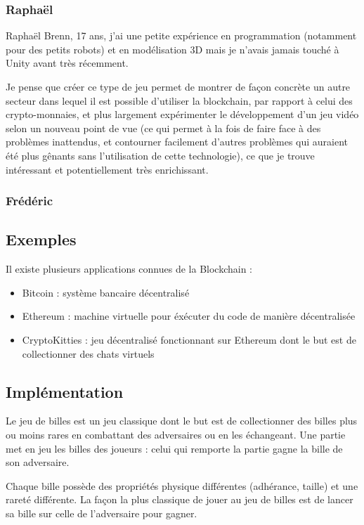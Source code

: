 \documentclass{article}
\begin{document}
\subsubsection{Raphaël}

Raphaël Brenn, 17 ans, j'ai une petite expérience en programmation (notamment pour des petits robots) et en modélisation 3D mais je n'avais jamais touché à Unity avant très récemment.

Je pense que créer ce type de jeu permet de montrer de façon concrète un autre secteur dans lequel il est possible d'utiliser la blockchain, par rapport à celui des crypto-monnaies, et plus largement expérimenter le développement d'un jeu vidéo selon un nouveau point de vue (ce qui permet à la fois de faire face à des problèmes inattendus, et contourner facilement d'autres problèmes qui auraient été plus gênants sans l'utilisation de cette technologie), ce que je trouve intéressant et 
potentiellement très enrichissant.

\subsubsection{Frédéric}

\subsection{Exemples}

Il existe plusieurs applications connues de la Blockchain :
\begin{itemize}
    \item Bitcoin : système bancaire décentralisé
    \item Ethereum : machine virtuelle pour éxécuter du code de manière décentralisée
    \item CryptoKitties : jeu décentralisé fonctionnant sur Ethereum dont le but est de collectionner des chats virtuels
\end{itemize}

\subsection{Implémentation}

Le jeu de billes est un jeu classique dont le but est de collectionner des billes plus ou moins rares en combattant des adversaires ou en les échangeant. Une partie met en jeu les billes des joueurs : celui qui remporte la partie gagne la bille de son adversaire.

Chaque bille possède des propriétés physique différentes (adhérance, taille) et une rareté différente.
La façon la plus classique de jouer au jeu de billes est de lancer sa bille sur celle de l'adversaire pour gagner.
\end{document}
